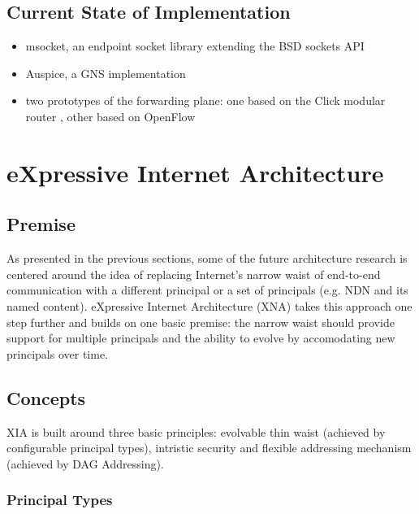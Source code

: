         \subsection{Current State of Implementation}

            \begin{itemize}
                \item msocket, an endpoint socket library extending the BSD sockets API
                \item Auspice, a GNS implementation
                \item two prototypes of the forwarding plane: one based on the Click modular router \cite{click}, other based on OpenFlow \cite{openflow}
            \end{itemize}

    \section{eXpressive Internet Architecture}\label{archs:xia}

        \subsection{Premise}

            As presented in the previous sections, some of the future architecture research is centered around the idea of replacing Internet's narrow waist of end-to-end communication with a different principal or a set of principals (e.g. NDN and its named content). eXpressive Internet Architecture (XNA) takes this approach one step further and builds on one basic premise: the narrow waist should provide support for multiple principals and the ability to evolve by accomodating new principals over time.

        \subsection{Concepts}

            XIA is built around three basic principles: evolvable thin waist (achieved by configurable principal types), intristic security and flexible addressing mechanism (achieved by DAG Addressing).

            \subsubsection{Principal Types}

